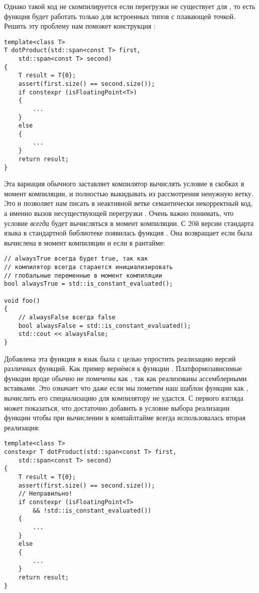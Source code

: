 Однако такой код не скомпилируется если перегрузки  не существует для , то есть функция будет работать только для встроенных типов с плавающей точкой. Решить эту проблему нам поможет конструкция :
\begin{verbatim}
template<class T>
T dotProduct(std::span<const T> first,
    std::span<const T> second)
{
    T result = T{0};
    assert(first.size() == second.size());
    if constexpr (isFloatingPoint<T>)
    {
        ...
    }
    else
    {
        ...
    }
    return result;
}
\end{verbatim}
Эта вариация обычного  заставляет компилятор вычислять условие в скобках в момент компиляции, и полностью выкидывать из рассмотрения ненужную ветку. Это и позволяет нам писать в неактивной ветке семантически некорректный код, а именно вызов несуществующей перегрузки . Очень важно понимать, что условие \textit{всегда} будет вычисляться в момент компиляции. С 20й версии стандарта языка в стандартной библиотеке появилась функция . Она возвращает  если была вычислена в момент компиляции и  если в рантайме:
\begin{verbatim}
// alwaysTrue всегда будет true, так как
// компилятор всегда старается инициализировать
// глобальные переменные в момент компиляции
bool alwaysTrue = std::is_constant_evaluated();

void foo()
{
    // alwaysFalse всегда false
    bool alwaysFalse = std::is_constant_evaluated();
    std::cout << alwaysFalse;
}
\end{verbatim}
Добавлена эта функция в язык была с целью упростить реализацию  версий различных функций. Как пример вернёмся к функции . Платформозависимые функции вроде  обычно не помечены как , так как реализованы ассемблерными вставками. Это означает что даже если мы пометим наш шаблон функции  как , вычислить его специализацию для  компилятору не удастся. С первого взгляда может показаться, что достаточно добавить в условие выбора реализации функции  чтобы при вычислении  в компайлтайме всегда использовалась вторая реализация:
\begin{verbatim}
template<class T>
constexpr T dotProduct(std::span<const T> first,
    std::span<const T> second)
{
    T result = T{0};
    assert(first.size() == second.size());
    // Неправильно!
    if constexpr (isFloatingPoint<T>
        && !std::is_constant_evaluated())
    {
        ...
    }
    else
    {
        ...
    }
    return result;
}
\end{verbatim}
